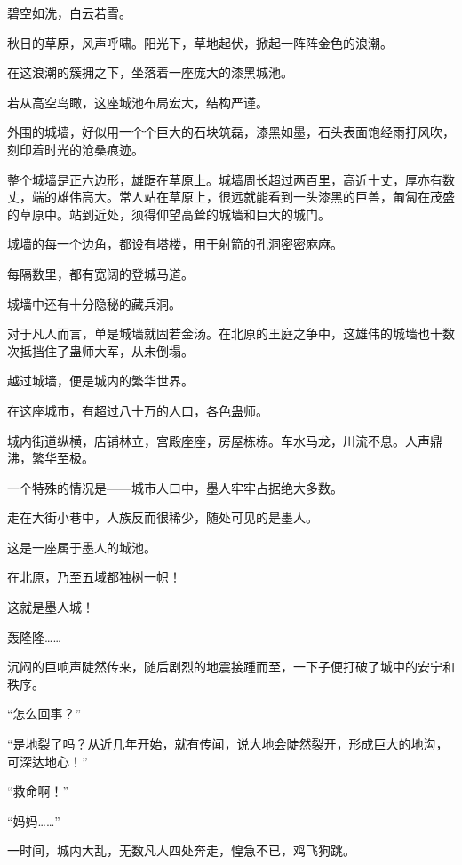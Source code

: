 
\begin{this_body}



碧空如洗，白云若雪。

秋日的草原，风声呼啸。阳光下，草地起伏，掀起一阵阵金色的浪潮。

在这浪潮的簇拥之下，坐落着一座庞大的漆黑城池。

若从高空鸟瞰，这座城池布局宏大，结构严谨。

外围的城墙，好似用一个个巨大的石块筑磊，漆黑如墨，石头表面饱经雨打风吹，刻印着时光的沧桑痕迹。

整个城墙是正六边形，雄踞在草原上。城墙周长超过两百里，高近十丈，厚亦有数丈，端的雄伟高大。常人站在草原上，很远就能看到一头漆黑的巨兽，匍匐在茂盛的草原中。站到近处，须得仰望高耸的城墙和巨大的城门。

城墙的每一个边角，都设有塔楼，用于射箭的孔洞密密麻麻。

每隔数里，都有宽阔的登城马道。

城墙中还有十分隐秘的藏兵洞。

对于凡人而言，单是城墙就固若金汤。在北原的王庭之争中，这雄伟的城墙也十数次抵挡住了蛊师大军，从未倒塌。

越过城墙，便是城内的繁华世界。

在这座城市，有超过八十万的人口，各色蛊师。

城内街道纵横，店铺林立，宫殿座座，房屋栋栋。车水马龙，川流不息。人声鼎沸，繁华至极。

一个特殊的情况是——城市人口中，墨人牢牢占据绝大多数。

走在大街小巷中，人族反而很稀少，随处可见的是墨人。

这是一座属于墨人的城池。

在北原，乃至五域都独树一帜！

这就是墨人城！

轰隆隆……

沉闷的巨响声陡然传来，随后剧烈的地震接踵而至，一下子便打破了城中的安宁和秩序。

“怎么回事？”

“是地裂了吗？从近几年开始，就有传闻，说大地会陡然裂开，形成巨大的地沟，可深达地心！”

“救命啊！”

“妈妈……”

一时间，城内大乱，无数凡人四处奔走，惶急不已，鸡飞狗跳。


\end{this_body}
